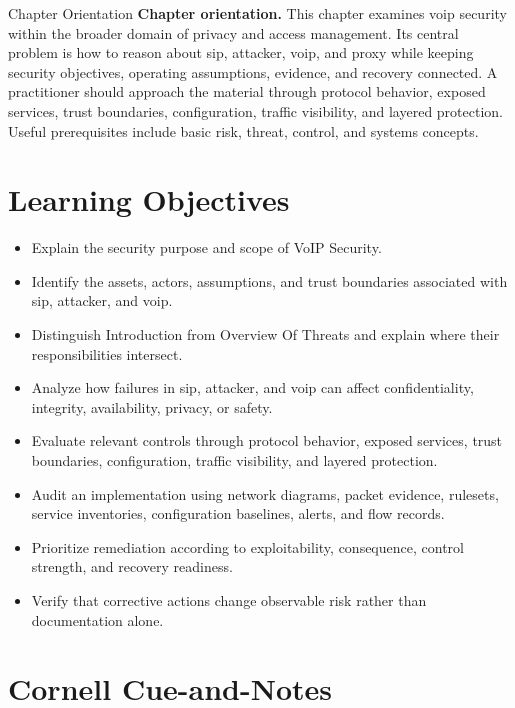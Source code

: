 \documentclass[11pt,letterpaper]{article}
\title{\CornellDocumentTitle}
\author{}
\date{}
\begin{document}
\maketitle
\begin{CornellOverviewBox}{Chapter Orientation}
\textbf{Chapter orientation.} This chapter examines voip security within the broader domain of privacy and access management. Its central problem is how to reason about sip, attacker, voip, and proxy while keeping security objectives, operating assumptions, evidence, and recovery connected. A practitioner should approach the material through protocol behavior, exposed services, trust boundaries, configuration, traffic visibility, and layered protection. Useful prerequisites include basic risk, threat, control, and systems concepts.
\end{CornellOverviewBox}
\section*{Learning Objectives}
\begin{itemize}
\item Explain the security purpose and scope of VoIP Security.
\item Identify the assets, actors, assumptions, and trust boundaries associated with sip, attacker, and voip.
\item Distinguish Introduction from Overview Of Threats and explain where their responsibilities intersect.
\item Analyze how failures in sip, attacker, and voip can affect confidentiality, integrity, availability, privacy, or safety.
\item Evaluate relevant controls through protocol behavior, exposed services, trust boundaries, configuration, traffic visibility, and layered protection.
\item Audit an implementation using network diagrams, packet evidence, rulesets, service inventories, configuration baselines, alerts, and flow records.
\item Prioritize remediation according to exploitability, consequence, control strength, and recovery readiness.
\item Verify that corrective actions change observable risk rather than documentation alone.
\end{itemize}
\section*{Cornell Cue-and-Notes}
\end{document}
